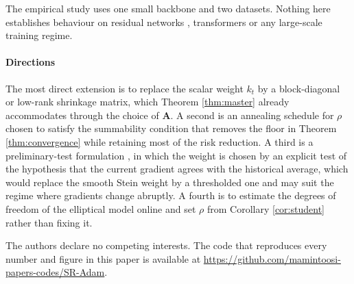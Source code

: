 \documentclass[pdflatex,sn-mathphys-num]{sn-jnl}%
\theoremstyle{thmstyleone}%
\theoremstyle{thmstyletwo}%
\theoremstyle{thmstylethree}%
\begin{document}
The empirical study uses one small backbone and two datasets. Nothing here establishes behaviour on residual networks \cite{he2016}, transformers \cite{vaswani2017} or any large-scale training regime.

\paragraph{Directions}

The most direct extension is to replace the scalar weight $k_t$ by a block-diagonal or low-rank shrinkage matrix, which Theorem \ref{thm:master} already accommodates through the choice of $\bm A$. A second is an annealing schedule for $\rho$ chosen to satisfy the summability condition that removes the floor in Theorem \ref{thm:convergence} while retaining most of the risk reduction. A third is a preliminary-test formulation \cite{saleh2006, judge1978}, in which the weight is chosen by an explicit test of the hypothesis that the current gradient agrees with the historical average, which would replace the smooth Stein weight by a thresholded one and may suit the regime where gradients change abruptly. A fourth is to estimate the degrees of freedom of the elliptical model online and set $\rho$ from Corollary \ref{cor:student} rather than fixing it.

\backmatter



The authors declare no competing interests. The code that reproduces every number and figure in this paper is available at \url{https://github.com/mamintoosi-papers-codes/SR-Adam}.
\end{document}
